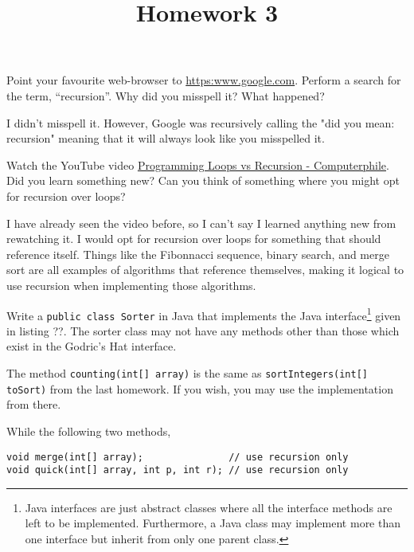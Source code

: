 \documentclass{homework}
\title{Homework 3}
\newcommand\computerphile{\href{%
    https://www.youtube.com/watch?v=HXNhEYqFo0o%
  }{Programming Loops vs Recursion - Computerphile}}
\begin{document}
 \maketitle

\question Point your favourite web-browser to \url{https:www.google.com}.
Perform a search for the term, ``recursion''. Why did you misspell
it? What happened?

\begin{sol}
  I didn't misspell it. However, Google was recursively calling the "did you mean: recursion" meaning that it will 
  always look like you misspelled it.
\end{sol}

\question\label{vid} Watch the YouTube video \computerphile. Did you
learn something new? Can you think of something where you might opt
for recursion over loops?

\begin{sol}
  I have already seen the video before, so I can't say I learned anything new from rewatching it.
  I would opt for recursion over loops for something that should reference itself. 
  Things like the Fibonnacci sequence, binary search, and merge sort are all examples of algorithms that reference themselves,
  making it logical to use recursion when implementing those algorithms.
\end{sol}

\question Write a \texttt{public class Sorter} in Java that implements the
Java interface\footnote{Java interfaces are just abstract classes
  where all the interface methods are left to be implemented.
  Furthermore, a Java class may implement more than one interface
  but inherit from only one parent class.} given in listing
??. The sorter class may not have any methods other than
those which exist in the Godric's Hat interface.

% 

The method \texttt{counting(int[] array)} is the same as
\texttt{sortIntegers(int[] toSort)} from the last homework. If you
wish, you may use the implementation from there.

While the following two methods,

\begin{verbatim}
void merge(int[] array);               // use recursion only
void quick(int[] array, int p, int r); // use recursion only
\end{verbatim}
\end{document}

